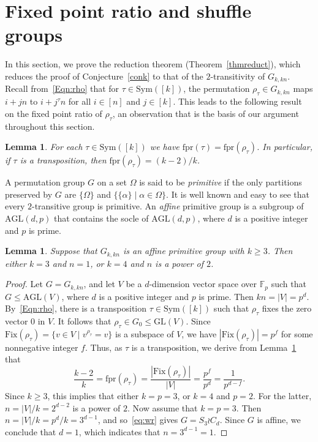 \documentclass[11pt,a4paper,reqno]{amsart}
\newcommand{\AGL}{\mathrm{AGL}}
\newcommand{\Fix}{\mathrm{Fix}}
\newcommand{\fpr}{\mathrm{fpr}}
\newcommand{\GL}{\mathrm{GL}}
\newcommand{\Sym}{\mathrm{Sym}}
\newcommand{\Sy}{S}
\newtheorem{lemma}[theorem]{Lemma}
\theoremstyle{definition}
\begin{document}
\section{Fixed point ratio and shuffle groups}\label{sec3}

In this section, we prove the reduction theorem (Theorem~\ref{thmreduct}), which reduces the proof of Conjecture~\ref{conk} to that of the $2$-transitivity of $G_{k,kn}$. Recall from~\eqref{Eqn:rho} that for $\tau\in\Sym([k])$, the permutation $\rho_\tau\in G_{k,kn}$ maps $i+jn$ to $i+j^\tau n$ for all $i\in[n]$ and $j\in[k]$. This leads to the following result on the fixed point ratio of $\rho_\tau$, an observation that is the basis of our argument throughout this section.

\begin{lemma}\label{lemfpr}
For each $\tau\in\Sym([k])$ we have $\fpr(\tau)=\fpr(\rho_{\tau})$. In particular, if $\tau$ is a transposition, then $\fpr(\rho_{\tau})=(k-2)/k$.
\end{lemma}

A permutation group $G$ on a set $\Omega$ is said to be \emph{primitive} if the only partitions preserved by $G$ are $\{\Omega\}$ and $\{\{\alpha\}\mid\alpha\in\Omega\}$. It is well known and easy to see that every $2$-transitive group is primitive. An \emph{affine} primitive group is a subgroup of $\AGL(d,p)$ that contains the socle of $\AGL(d,p)$, where $d$ is a positive integer and $p$ is prime.

\begin{lemma}\label{lemaffine}
Suppose that $G_{k,kn}$ is an affine primitive group with $k\geq3$. Then either $k=3$ and $n=1$, or $k=4$ and $n$ is a power of $2$.
\end{lemma}

\begin{proof}
Let $G=G_{k,kn}$, and let $V$ be a $d$-dimension vector space over $\mathbb{F}_p$ such that $G\leq\AGL(V)$, where $d$ is a positive integer and $p$ is prime. Then $kn=|V|=p^d$. By~\eqref{Eqn:rho}, there is a transposition $\tau\in\Sym([k])$ such that $\rho_\tau$ fixes the zero vector $0$ in $V$. It follows that $\rho_\tau\in G_0\leq\GL(V)$. Since $\Fix(\rho_\tau)=\{v\in V\mid v^{\rho_\tau}=v\}$ is a subspace of $V$, we have $|\Fix(\rho_\tau)|=p^f$ for some nonnegative integer $f$. Thus, as $\tau$ is a transposition, we derive from Lemma~\ref{lemfpr} that
\[
\frac{k-2}{k}=\fpr(\rho_\tau)=\frac{|\Fix(\rho_\tau)|}{|V|}=\frac{p^f}{p^d}=\frac{1}{p^{d-f}}.
\]
Since $k\geq3$, this implies that either $k=p=3$, or $k=4$ and $p=2$. For the latter, $n=|V|/k=2^{d-2}$ is a power of $2$. Now assume that $k=p=3$. Then $n=|V|/k=p^d/k=3^{d-1}$, and so~\eqref{eq:wr} gives $G=\Sy_3\wr C_{d}$. Since $G$ is affine, we conclude that $d=1$, which indicates that $n=3^{d-1}=1$.
\end{proof}
\end{document}
